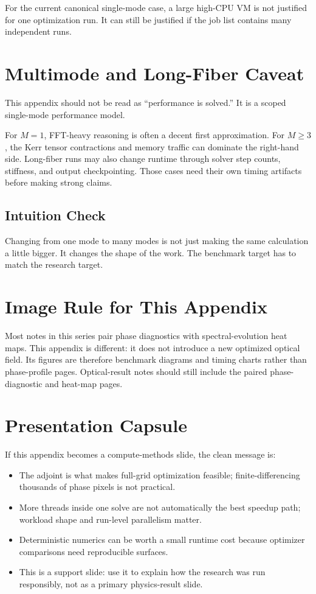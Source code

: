 \documentclass[11pt]{article}
\begin{document}
For the current canonical single-mode case, a large high-CPU VM is not justified
for one optimization run. It can still be justified if the job list contains
many independent runs.

\section{Multimode and Long-Fiber Caveat}

This appendix should not be read as ``performance is solved.'' It is a scoped
single-mode performance model.

For \(M=1\), FFT-heavy reasoning is often a decent first approximation. For
\(M\ge 3\), the Kerr tensor contractions and memory traffic can dominate the
right-hand side. Long-fiber runs may also change runtime through solver step
counts, stiffness, and output checkpointing. Those cases need their own timing
artifacts before making strong claims.

\subsection*{Intuition Check}

Changing from one mode to many modes is not just making the same calculation a
little bigger. It changes the shape of the work. The benchmark target has to
match the research target.

\section{Image Rule for This Appendix}

Most notes in this series pair phase diagnostics with spectral-evolution heat
maps. This appendix is different: it does not introduce a new optimized optical
field. Its figures are therefore benchmark diagrams and timing charts rather
than phase-profile pages. Optical-result notes should still include the paired
phase-diagnostic and heat-map pages.

\section{Presentation Capsule}

If this appendix becomes a compute-methods slide, the clean message is:
\begin{itemize}
    \item The adjoint is what makes full-grid optimization feasible; finite-differencing thousands of phase pixels is not practical.
    \item More threads inside one solve are not automatically the best speedup path; workload shape and run-level parallelism matter.
    \item Deterministic numerics can be worth a small runtime cost because optimizer comparisons need reproducible surfaces.
    \item This is a support slide: use it to explain how the research was run responsibly, not as a primary physics-result slide.
\end{itemize}
\end{document}
